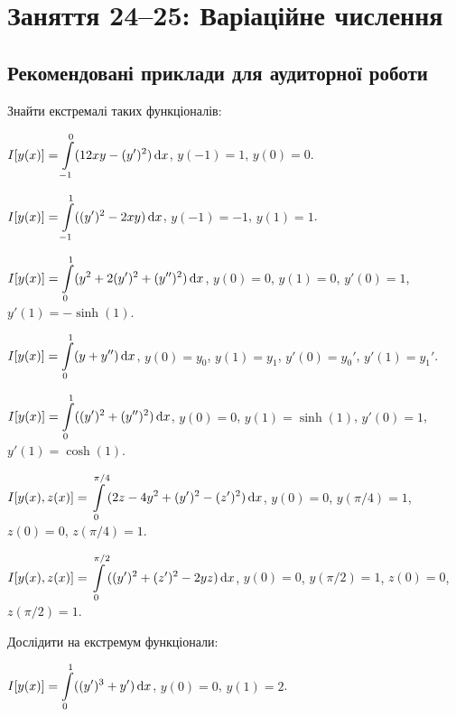 \section*{Заняття 24--25: Варіаційне числення}

\subsection*{Рекомендовані приклади для аудиторної роботи}

Знайти екстремалі таких функціоналів:

\begin{problem}
	$I[y(x)] = \displaystyle\int\limits_{-1}^0 (12 x y - (y')^2) \mathop{}\!\mathrm{d} x$, $y(-1) = 1$, $y(0) = 0$.
\end{problem}

\begin{problem}
	$I[y(x)] = \displaystyle\int\limits_{-1}^1 ((y')^2 - 2 x y) \mathop{}\!\mathrm{d} x$, $y(-1) = -1$, $y(1) = 1$.
\end{problem}

\begin{problem}
	$I[y(x)] = \displaystyle\int\limits_0^1 (y^2 + 2 (y')^2 + (y'')^2) \mathop{}\!\mathrm{d} x$, $y(0) = 0$, $y(1) = 0$, $y'(0) = 1$, $y'(1) = - \sinh (1)$.
\end{problem}

\begin{problem}
	$I[y(x)] = \displaystyle\int\limits_0^1 (y + y'') \mathop{}\!\mathrm{d} x$, $y(0) = y_0$, $y(1) = y_1$, $y'(0) = y_0'$, $y'(1) = y_1'$.
\end{problem}

\begin{problem}
	$I[y(x)] = \displaystyle\int\limits_0^1 ((y')^2 + (y'')^2) \mathop{}\!\mathrm{d} x$, $y(0) = 0$, $y(1) = \sinh (1)$, $y'(0) = 1$, $y'(1) = \cosh (1)$.
\end{problem}

\begin{problem}
	$I[y(x), z(x)] = \displaystyle\int\limits_0^{\pi / 4} (2 z - 4 y^2 + (y')^2 - (z')^2) \mathop{}\!\mathrm{d} x$, $y(0) = 0$, $y(\pi / 4) = 1$, $z(0) = 0$, $z(\pi / 4) = 1$.
\end{problem}

\begin{problem}
	$I[y(x), z(x)] = \displaystyle\int\limits_0^{\pi / 2} ((y')^2 + (z')^2 - 2 y z) \mathop{}\!\mathrm{d} x$, $y(0) = 0$, $y(\pi / 2) = 1$, $z(0) = 0$, $z(\pi / 2) = 1$.
\end{problem}

Дослідити на екстремум функціонали:

\begin{problem}
	$I[y(x)] = \displaystyle\int\limits_0^1 ((y')^3 + y') \mathop{}\!\mathrm{d} x$, $y(0) = 0$, $y(1) = 2$.
\end{problem}

